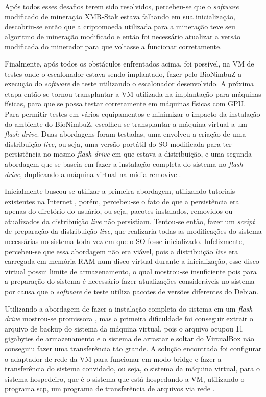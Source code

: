 Após todos esses desafios terem sido resolvidos, percebeu-se que o \textit{software} modificado de mineração XMR-Stak estava falhando em sua inicialização, descobriu-se então que a criptomoeda utilizada para a mineração teve seu algoritmo de mineração modificado e então foi necessário atualizar a versão modificada do minerador para que voltasse a funcionar corretamente.

Finalmente, após todos os obstáculos enfrentados acima, foi possível, na \acrshort{VM} de testes onde o escalonador estava sendo implantado, fazer pelo BioNimbuZ a execução do \textit{software} de teste utilizando o escalonador desenvolvido. A próxima etapa então se tornou transplantar a \acrshort{VM} utilizada na implantação para máquinas físicas, para que se possa testar corretamente em máquinas físicas com \acrshort{GPU}. Para permitir testes em vários equipamentos e minimizar o impacto da instalação do ambiente do BioNimbuZ, escolheu se transplantar a máquina virtual a um \textit{flash drive}. Duas abordagens foram testadas, uma envolveu a criação de uma distribuição \textit{live}, ou seja, uma versão portátil do \acrshort{SO} modificada para ter persistência no mesmo \textit{flash drive} em que estava a distribuição, e uma segunda abordagem que se baseia em fazer a instalação completa do sistema no \textit{flash drive}, duplicando a máquina virtual na mídia removível.

Inicialmente buscou-se utilizar a primeira abordagem, utilizando tutoriais existentes na Internet \cite{PersistantDebianLive} \cite{PersistantDebianLive2}, porém, percebeu-se o fato de que a persistência era apenas do diretório do usuário, ou seja, pacotes instalados, removidos ou atualizados da distribuição \textit{live} não persistiam. Tentou-se então, fazer um \textit{script} de preparação da distribuição \textit{live}, que realizaria todas as modificações do sistema necessárias no sistema toda vez em que o \acrfull{SO} fosse inicializado. Infelizmente, percebeu-se que essa abordagem não era viável, pois a distribuição \textit{live} era carregada em memória  \acrshort{RAM} num disco virtual durante a inicialização, esse disco virtual possui limite de armazenamento, o qual mostrou-se insuficiente pois para a preparação do sistema é necessário fazer atualizações consideráveis no sistema por causa que o \textit{software} de teste utiliza pacotes de versões diferentes do Debian.

Utilizando a abordagem de fazer a instalação completa do sistema em um \textit{flash drive} mostrou-se promissora \cite{DuplicarSistema}, mas a primeira dificuldade foi conseguir extrair o arquivo de backup do sistema da máquina virtual, pois o arquivo ocupou 11 gigabytes de armazenamento e o sistema de arrastar e soltar do VirtualBox não conseguiu fazer uma transferência tão grande. A solução encontrada foi configurar o adaptador de rede da \acrshort{VM} para funcionar em modo bridge \cite{NetworkVirtualBox} e fazer a transferência do sistema convidado, ou seja, o sistema da máquina virtual, para o sistema hospedeiro, que é o sistema que está hospedando a \acrshort{VM}, utilizando o programa scp, um programa de transferência de arquivos via rede \cite{LinuxSCP}.

